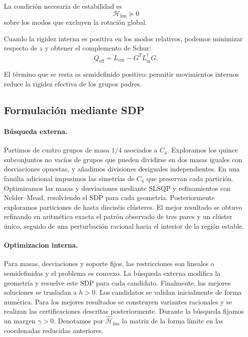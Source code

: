 La condición necesaria de estabilidad es
\begin{equation}
    \mathcal{H}_{\mathrm{lim}}\succeq 0
    \label{eq:hessiano_limite}
\end{equation}
sobre los modos que excluyen la rotación global.

Cuando la rigidez interna es positiva en los
modos relativos, podemos minimizar respecto
de $z$ y obtener el complemento de Schur:
\begin{equation}
    Q_{\mathrm{eff}}
    =
    L_{\mathrm{cut}}
    -G^TL_{\mathrm{in}}^\dagger G.
\end{equation}

El término que se resta es semidefinido positivo:
permitir movimientos internos reduce la rigidez
efectiva de los grupos padres.

\subsection{Formulación mediante SDP}

\paragraph{Búsqueda externa.}
Partimos de cuatro grupos de masa $1/4$ asociados a $C_4$.
Exploramos los quince subconjuntos no vacíos de grupos que
pueden dividirse en dos masas iguales con desviaciones
opuestas, y añadimos divisiones desiguales independientes.
En una familia adicional impusimos las simetrías de $C_4$
que preservan cada partición. Optimizamos las masas y
desviaciones mediante SLSQP y refinamientos con
Nelder--Mead, resolviendo el SDP para cada geometría. Posteriormente exploramos particiones de hasta dieciséis
clústeres. El mejor resultado se obtuvo refinando en
aritmética exacta el patrón observado de tres pares y un
clúster único, seguido de una perturbación racional hacia
el interior de la región estable.

\paragraph{Optimizacion interna.}
Para masas, desviaciones y soporte fijos, las restricciones son lineales o semidefinidas y el problema es convexo. La búsqueda externa modifica la geometría y resuelve este SDP para cada candidato. Finalmente, las mejores soluciones se trasladan a \(h>0\). Los candidatos se validan inicialmente de forma
numérica. Para los mejores resultados se construyen
variantes racionales y se realizan las
certificaciones descritas posteriormente.
Durante la búsqueda fijamos un margen $\gamma>0$.
Denotamos por $\widehat{\mathcal H}_{\mathrm{lim}}$
la matriz de la forma límite en las coordenadas
reducidas anteriores.

